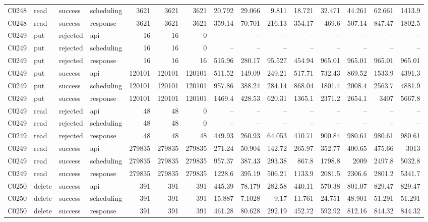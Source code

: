 \begin{landscape}
\begin{longtable}{llllrrrrrrrrrrr}
C0248 & read & success & scheduling & 3621 & 3621 & 3621 & 20.792 & 29.066 & 9.811 & 18.721 & 32.471 & 44.261 & 62.661 & 1413.9\\
C0248 & read & success & response & 3621 & 3621 & 3621 & 359.14 & 70.701 & 216.13 & 354.17 & 469.6 & 507.14 & 847.47 & 1802.5\\
C0249 & put & rejected & api & 16 & 16 & 0 & -- & -- & -- & -- & -- & -- & -- & --\\
C0249 & put & rejected & scheduling & 16 & 16 & 0 & -- & -- & -- & -- & -- & -- & -- & --\\
C0249 & put & rejected & response & 16 & 16 & 16 & 515.96 & 280.17 & 95.527 & 454.94 & 965.01 & 965.01 & 965.01 & 965.01\\
C0249 & put & success & api & 120101 & 120101 & 120101 & 511.52 & 149.09 & 249.21 & 517.71 & 732.43 & 869.52 & 1533.9 & 4391.3\\
C0249 & put & success & scheduling & 120101 & 120101 & 120101 & 957.86 & 388.24 & 284.14 & 868.04 & 1801.4 & 2008.4 & 2563.7 & 4881.9\\
C0249 & put & success & response & 120101 & 120101 & 120101 & 1469.4 & 428.53 & 620.31 & 1365.1 & 2371.2 & 2654.1 & 3407 & 5667.8\\
C0249 & read & rejected & api & 48 & 48 & 0 & -- & -- & -- & -- & -- & -- & -- & --\\
C0249 & read & rejected & scheduling & 48 & 48 & 0 & -- & -- & -- & -- & -- & -- & -- & --\\
C0249 & read & rejected & response & 48 & 48 & 48 & 449.93 & 260.93 & 64.053 & 410.71 & 900.84 & 980.61 & 980.61 & 980.61\\
C0249 & read & success & api & 279835 & 279835 & 279835 & 271.24 & 50.904 & 142.72 & 265.97 & 352.77 & 400.65 & 475.66 & 3013\\
C0249 & read & success & scheduling & 279835 & 279835 & 279835 & 957.37 & 387.43 & 293.38 & 867.8 & 1798.8 & 2009 & 2497.8 & 5032.8\\
C0249 & read & success & response & 279835 & 279835 & 279835 & 1228.6 & 395.19 & 506.21 & 1133.9 & 2081.5 & 2306.6 & 2801.2 & 5341.7\\
C0250 & delete & success & api & 391 & 391 & 391 & 445.39 & 78.179 & 282.58 & 440.11 & 570.38 & 801.07 & 829.47 & 829.47\\
C0250 & delete & success & scheduling & 391 & 391 & 391 & 15.887 & 7.1028 & 9.17 & 11.761 & 24.751 & 48.901 & 51.291 & 51.291\\
C0250 & delete & success & response & 391 & 391 & 391 & 461.28 & 80.628 & 292.19 & 452.72 & 592.92 & 812.16 & 844.32 & 844.32\\

\end{longtable}
\end{landscape}
